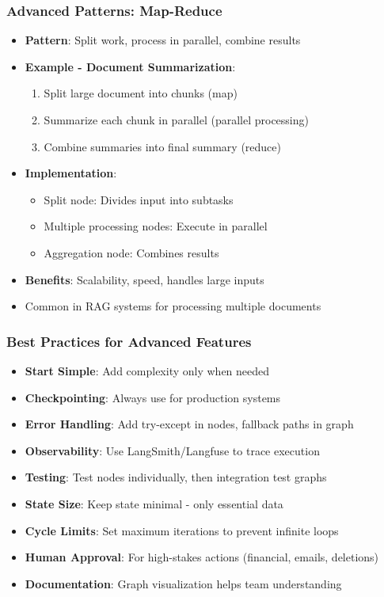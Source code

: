 \begin{frame}[fragile]\frametitle{Advanced Patterns: Map-Reduce}
      \begin{itemize}
        \item \textbf{Pattern}: Split work, process in parallel, combine results
        \item \textbf{Example - Document Summarization}:
        \begin{enumerate}
            \item Split large document into chunks (map)
            \item Summarize each chunk in parallel (parallel processing)
            \item Combine summaries into final summary (reduce)
        \end{enumerate}
        \item \textbf{Implementation}:
        \begin{itemize}
            \item Split node: Divides input into subtasks
            \item Multiple processing nodes: Execute in parallel
            \item Aggregation node: Combines results
        \end{itemize}
        \item \textbf{Benefits}: Scalability, speed, handles large inputs
        \item Common in RAG systems for processing multiple documents
      \end{itemize}
\end{frame}

\begin{frame}[fragile]\frametitle{Best Practices for Advanced Features}
      \begin{itemize}
        \item \textbf{Start Simple}: Add complexity only when needed
        \item \textbf{Checkpointing}: Always use for production systems
        \item \textbf{Error Handling}: Add try-except in nodes, fallback paths in graph
        \item \textbf{Observability}: Use LangSmith/Langfuse to trace execution
        \item \textbf{Testing}: Test nodes individually, then integration test graphs
        \item \textbf{State Size}: Keep state minimal - only essential data
        \item \textbf{Cycle Limits}: Set maximum iterations to prevent infinite loops
        \item \textbf{Human Approval}: For high-stakes actions (financial, emails, deletions)
        \item \textbf{Documentation}: Graph visualization helps team understanding
      \end{itemize}
\end{frame}

